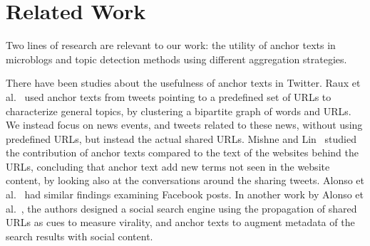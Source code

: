 \section{Related Work}\label{sec:related}

Two lines of research are relevant to our work: the utility of anchor texts in
microblogs and topic detection methods using different aggregation strategies. 



There have been studies about the usefulness of anchor texts in Twitter. 
%
Raux et al.~\cite{raux2011describing} used anchor texts from tweets pointing to a
predefined set of URLs to characterize general topics, by clustering a bipartite
graph of words and URLs. 
%
We instead focus on news events, and tweets related to these news, without using
predefined URLs, but instead the actual shared URLs. 
%
Mishne and Lin~\cite{mishne2012twanchor} studied the
contribution of anchor texts compared to the text of the websites behind the
URLs, concluding that anchor text add new terms not seen in the website content,
by looking also at the conversations around the sharing tweets. 
%
Alonso et al.~\cite{Alonso:2015:WCW:2740908.2745397} had similar findings examining
Facebook posts. 
%
In another work by Alonso et al.~\cite{Alonso:2017:WHH:3091478.3091484}, the authors designed a social search
engine using the propagation of shared URLs as cues to measure virality, and anchor texts to augment metadata of the search results with social
content. 

